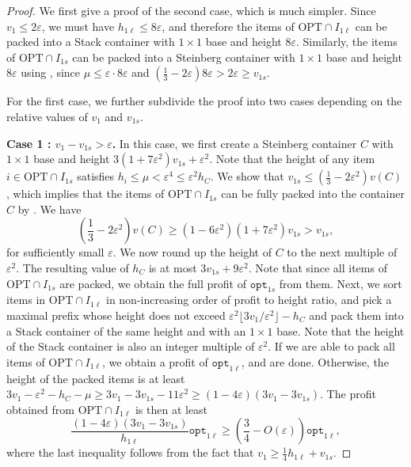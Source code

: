 \documentclass[10pt,a4paper]{amsart}
\renewcommand{\epsilon}{\varepsilon} %
\theoremstyle{definition}
\newcommand{\optonel}{\mathtt{opt}_{1\ell}}
\newcommand{\optones}{\mathtt{opt}_{1s}}
\newcommand{\honel}{h_{1\ell}}
\newcommand{\vones}{v_{1s}}
\begin{document}
\begin{proof}
    We first give a proof of the second case, which is much simpler. Since $v_1\le 2\epsilon$, we must have $\honel\le 8\epsilon$, and therefore the items of $\text{OPT}\cap I_{1\ell}$ can be packed into a Stack container with $1\times 1$ base and height $8\epsilon$. Similarly, the items of $\text{OPT}\cap I_{1s}$ can be packed into a Steinberg container with $1\times 1$ base and height $8\epsilon$ using , since $\mu \le \epsilon\cdot 8\epsilon$ and $\left(\frac{1}{3}-2\epsilon\right)8\epsilon > 2\epsilon \ge \vones$.


    For the first case, we further subdivide the proof into two cases depending on the relative values of $v_1$ and $\vones$.

    \textbf{Case 1 : $v_1-\vones >\epsilon$.} In this case, we first create a Steinberg container $C$ with $1\times 1$ base and height $3(1+7\epsilon^2)\vones + \epsilon^2$. Note that the height of any item $i\in \text{OPT}\cap I_{1s}$ satisfies $h_i \le \mu < \epsilon^4 \le \epsilon^2 h_C$. We show that $\vones \le \left(\frac{1}{3}-2\epsilon^2\right)v(C)$, which implies that the items of $\text{OPT}\cap I_{1s}$ can be fully packed into the container $C$ by . We have
    \[ \left(\frac{1}{3}-2\epsilon^2\right)v(C) \ge (1-6\epsilon^2)(1+7\epsilon^2)\vones
    > \vones, \]
    for sufficiently small $\epsilon$. We now round up the height of $C$ to the next multiple of $\epsilon^2$. The resulting value of $h_C$ is at most $3\vones+ 9\epsilon^2$. Note that since all items of $\text{OPT}\cap I_{1s}$ are packed, we obtain the full profit of $\optones$ from them. Next, we sort items in $\text{OPT}\cap I_{1\ell}$ in non-increasing order of profit to height ratio, and pick a maximal prefix whose height does not exceed $\epsilon^2 \lfloor3v_1/\epsilon^2\rfloor -h_C$ and pack them into a Stack container of the same height and with an $1\times 1$ base. Note that the height of the Stack container is also an integer multiple of $\epsilon^2$. If we are able to pack all items of $\text{OPT}\cap I_{1\ell}$, we obtain a profit of $\optonel$, and are done. Otherwise, the height of the packed items is at least $3v_1-\epsilon^2 - h_C -\mu\ge 3v_1-3\vones-11\epsilon^2 \ge (1-4\epsilon)(3v_1 - 3\vones)$. The profit obtained from $\text{OPT}\cap I_{1\ell}$ is then at least
    \[ \frac{(1-4\epsilon)(3v_1-3\vones)}{\honel}\optonel \ge \left(\frac{3}{4}-O(\epsilon)\right)\optonel, \]
    where the last inequality follows from the fact that $v_1\ge \frac{1}{4}\honel+\vones$.


\end{proof}
\end{document}

